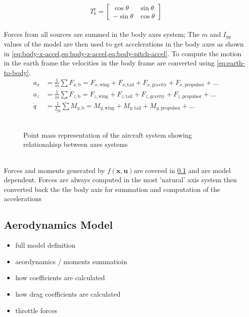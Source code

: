 \documentclass[]{article}
\newcommand{\plant}{$f\left(\mathbf{x},\mathbf{u}\right)$}
\begin{document}
	\begin{equation} \label{eq:earth-to-body}
		T_b^e = \begin{bmatrix}
			\cos{\theta} & \sin{\theta} \\
			-\sin{\theta} & \cos{\theta}
		\end{bmatrix}
	\end{equation}
	\\
	Forces from all sources are summed in the body axes system; The $m$ and $I_{yy}$ values of the model are then used to get accelerations in the body axes as shown in \cref{eq:body-x-accel,eq:body-z-accel,eq:body-pitch-accel}. 
	To compute the motion in the earth frame the velocities in the body frame are converted using \ref{eq:earth-to-body}.
	\\
	\begin{align} 
		a_x & = \frac{1}{m}\sum F_{x, \mathrm{b}} =  F_{x,\mathrm{wing}} + F_{x,\mathrm{tail}} + F_{x,\mathrm{gravity}} + F_{x,\mathrm{propulsor}} + ... \label{eq:body-x-accel}\\
		a_z & = \frac{1}{m}\sum F_{z, \mathrm{b}} =  F_{z,\mathrm{wing}} + F_{z,\mathrm{tail}} + F_{z,\mathrm{gravity}} + F_{z,\mathrm{propulsor}} + ... \label{eq:body-z-accel}\\
		\dot{q} & = \frac{1}{I_{yy}}\sum M_{y, \mathrm{b}} =  M_{y,\mathrm{wing}} + M_{y,\mathrm{tail}}  + M_{y,\mathrm{propulsor}} + ... \label{eq:body-pitch-accel} 
	\end{align}
	\\
		\begin{figure}[!h]
		\label{fig:point-mass}
		\caption{Point mass representation of the aircraft system showing relationahisp between axes systems}
	\end{figure}
	\\
	Forces and moments generated by \plant are covered in \cref{sec:aero-model} and are model dependent. 
	Forces are always computed in the most 'natural' axis system then converted back the the body axis for summation and computation of the accelerations
	
	
	\subsection{Aerodynamics Model} \label{sec:aero-model}
	
	\begin{itemize}
		\item full model definition
		\item aeordynamics / moments summatioin
		\item how coefficients are calculated
		\item how drag coefficients are calculated
		\item throttle forces
	\end{itemize}
	
\end{document}
